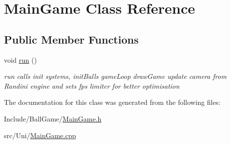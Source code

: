 \hypertarget{classMainGame}{
\section{MainGame Class Reference}
\label{classMainGame}
}
\subsection*{Public Member Functions}
\begin{DoxyCompactItemize}
\item 
\hypertarget{classMainGame_adacd3f33a9f5e53f33f967d0d66f4d58}{
void \hyperlink{classMainGame_adacd3f33a9f5e53f33f967d0d66f4d58}{run} ()}
\label{classMainGame_adacd3f33a9f5e53f33f967d0d66f4d58}

\begin{DoxyCompactList}\small\item\em run calls init systems, initBalls gameLoop drawGame update camera from Randini engine and sets fps limiter for better optimisation \item\end{DoxyCompactList}\end{DoxyCompactItemize}


The documentation for this class was generated from the following files:\begin{DoxyCompactItemize}
\item 
Include/BallGame/\hyperlink{MainGame_8h}{MainGame.h}\item 
src/Uni/\hyperlink{MainGame_8cpp}{MainGame.cpp}\end{DoxyCompactItemize}
